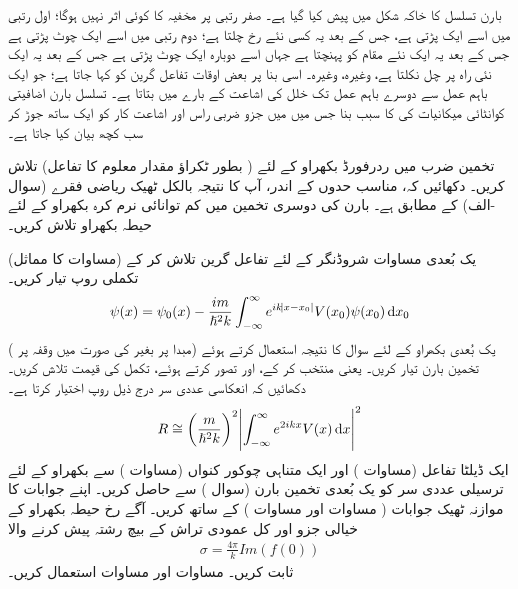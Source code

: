 بارن تسلسل کا خاکہ شکل  میں پیش کیا گیا ہے۔ صفر رتبی  پر مخفیہ کا کوئی اثر نہیں ہوگا؛ اول رتبی میں اسے ایک  پڑتی ہے، جس کے بعد یہ کسی نئے رخ چلتا ہے؛ دوم رتبی میں اسے ایک چوٹ پڑتی ہے جس کے بعد یہ ایک نئے مقام کو پہنچتا ہے جہاں اسے دوبارہ ایک چوٹ پڑتی ہے جس کے بعد یہ ایک نئی راہ پر چل نکلتا ہے، وغیرہ، وغیرہ۔ اسی بنا پر بعض اوقات تفاعل گرین کو  کہا جاتا ہے؛ جو ایک باہم عمل سے دوسرے باہم عمل تک خلل کی اشاعت کے بارے میں بتاتا ہے۔ تسلسل بارن اضافیتی کوانٹائی میکانیات کی کا سبب بنا جس میں  میں جزو ضربی راس  اور اشاعت کار  کو ایک ساتھ جوڑ کر سب کچھ بیان کیا جاتا ہے۔

تخمین ضرب میں ردرفورڈ بکھراو کے لئے  ( بطور ٹکراؤ مقدار معلوم کا تفاعل) تلاش کریں۔ دکھائیں کہ، مناسب حدوں کے اندر، آپ کا نتیجہ بالکل ٹھیک ریاضی فقرے (سوال -الف) کے مطابق ہے۔
بارن کی دوسری تخمین میں کم توانائی نرم کرہ بکھراو کے لئے حیطہ بکھراو تلاش کریں۔

 
یک بُعدی مساوات شروڈنگر کے لئے تفاعل گرین تلاش کر کے (مساوات  کا مماثل) تکملی روپ تیار کریں۔
\begin{align}
	\psi(x)=\psi_0(x)-\frac{im}{\hslash^2k}\int_{-\infty}^{\infty}e^{ik\abs{x-x_0}}V(x_0)\psi(x_0)\dif x_0
\end{align}
یک بُعدی بکھراو کے لئے سوال  کا نتیجہ استعمال کرتے ہوئے (مبدا پر بغیر  کی صورت میں وقفہ  پر ) تخمین بارن تیار کریں۔ یعنی  منتخب کر کے، اور  تصور کرتے ہوئے، تکمل کی قیمت تلاش کریں۔ دکھائیں کہ انعکاسی عددی سر درج ذیل روپ اختیار کرتا ہے۔
\begin{align}
	R\cong\left(\frac{m}{\hslash^2k}\right)^2\abs{\int_{-\infty}^{\infty}e^{2ikx}V(x)\dif x}^2
\end{align}
ایک ڈیلٹا تفاعل (مساوات ) اور ایک متناہی چوکور کنواں (مساوات ) سے بکھراو کے لئے ترسیلی عددی سر  کو یک بُعدی تخمین بارن (سوال ) سے حاصل کریں۔ اپنے جوابات کا موازنہ ٹھیک جوابات ( مساوات  اور مساوات ) کے ساتھ کریں۔
آگے رخ حیطہ بکھراو کے خیالی جزو اور کل عمودی تراش کے بیچ رشتہ پیش کرنے والا  
\begin{align}
	\sigma = \frac{4\pi}{k}Im(f(0))
\end{align}
ثابت کریں۔  مساوات  اور مساوات  استعمال کریں۔
